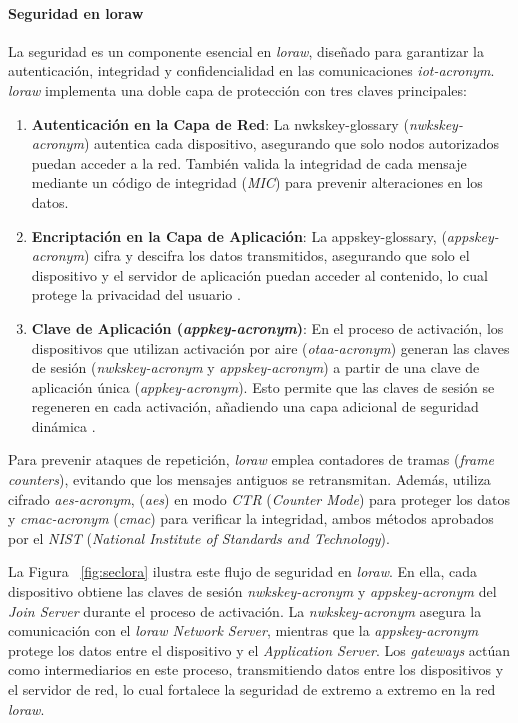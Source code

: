 \paragraph{Seguridad en \acrshort{loraw}\\}
La seguridad es un componente esencial en \textit{\acrshort{loraw}}, diseñado para garantizar la autenticación, integridad y confidencialidad en las comunicaciones \textit{\acrshort{iot-acronym}}. \textit{\acrshort{loraw}} implementa una doble capa de protección con tres claves principales:
\begin{enumerate}
    \item \textbf{Autenticación en la Capa de Red}: La \gls{nwkskey-glossary} (\textit{nwkskey-acronym}) autentica cada dispositivo, asegurando que solo nodos autorizados puedan acceder a la red. También valida la integridad de cada mensaje mediante un código de integridad (\textit{MIC}) para prevenir alteraciones en los datos.
    \item \textbf{Encriptación en la Capa de Aplicación}: La \gls{appskey-glossary}, (\textit{\gls{appskey-acronym}}) cifra y descifra los datos transmitidos, asegurando que solo el dispositivo y el servidor de aplicación puedan acceder al contenido, lo cual protege la privacidad del usuario \cite{doc_overviewsemtech, doc_loraphysemtech, ttn_security}.
    \item \textbf{Clave de Aplicación (\textit{\acrshort{appkey-acronym}})}: En el proceso de activación, los dispositivos que utilizan activación por aire (\textit{\acrshort{otaa-acronym}}) generan las claves de sesión (\textit{\acrshort{nwkskey-acronym}} y \textit{\acrshort{appskey-acronym}}) a partir de una clave de aplicación única (\textit{\acrshort{appkey-acronym}}). Esto permite que las claves de sesión se regeneren en cada activación, añadiendo una capa adicional de seguridad dinámica \cite{ttn_security, lorawan_security_whitepaper}.
\end{enumerate}

Para prevenir ataques de repetición, \textit{\acrshort{loraw}} emplea contadores de tramas (\textit{frame counters}), evitando que los mensajes antiguos se retransmitan. Además, utiliza cifrado \textit{\gls{aes-acronym}},  (\textit{\gls{aes}}) en modo \textit{CTR} (\textit{Counter Mode}) para proteger los datos y \textit{\acrshort{cmac-acronym}} (\textit{\gls{cmac}}) para verificar la integridad, ambos métodos aprobados por el \textit{NIST} (\textit{National Institute of Standards and Technology}).

La Figura ~\ref{fig:seclora} ilustra este flujo de seguridad en \textit{\acrshort{loraw}}. En ella, cada dispositivo obtiene las claves de sesión \textit{\acrshort{nwkskey-acronym}} y \textit{\acrshort{appskey-acronym}} del \textit{Join Server} durante el proceso de activación. La \textit{\acrshort{nwkskey-acronym}} asegura la comunicación con el \textit{\acrshort{loraw} Network Server}, mientras que la \textit{\acrshort{appskey-acronym}} protege los datos entre el dispositivo y el \textit{Application Server}. Los \textit{gateways} actúan como intermediarios en este proceso, transmitiendo datos entre los dispositivos y el servidor de red, lo cual fortalece la seguridad de extremo a extremo en la red \textit{\acrshort{loraw}}.

